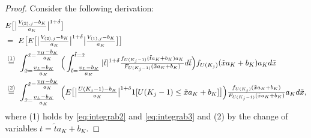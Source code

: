\begin{proof}
Consider the following derivation:
\begin{align}
&E\big[ \big\vert \tfrac{V_{(2),j}-b_{K}}{a_{K}}\big\vert ^{1+\delta } \big] \notag\\
&=~E\big[  E\big[ \big\vert \tfrac{V_{(2),j}-b_{K}}{a_{K}} \big\vert ^{1+\delta }\big\vert \tfrac{V_{(1),j}-b_{K}}{a_{K}}\big] \big] \notag\\
& \overset{(1)}{=}~\int_{\tilde{x}=\tfrac{v_{L}-b_{K}}{a_{K}}}^{\tilde{x}= \tfrac{v_{H}-b_{K}}{a_{K}}}\Big( \int_{\tilde{t}=\tfrac{v_{L}-b_{K}}{a_{K}}}^{ \tilde{t}=\tilde{x}}\vert \tilde{t}\vert ^{1+\delta }\tfrac{ f_{U(K_{j}-1)}( \tilde{t}a_{K}+b_{K}) a_{K}}{ F_{U(K_{j}-1)}( \tilde{x}a_{K}+b_{K}) }d\tilde{t }\Big) f_{U(K_{j})}( \tilde{x}a_{K}+b_{K}) a_{K}d\tilde{x} \nonumber \\
& \overset{(2)}{=}~
\int_{\tilde{x}=\tfrac{v_{L}-b_{K}}{a_{K}}}^{\tilde{x}=\tfrac{v_{H}-b_{K}}{ a_{K}}}\Big( E\big[ \big\vert \tfrac{U(K_{j}-1)-b_{K}}{ a_{K}}\big\vert ^{1+\delta }1[ U(K_{j}-1)\leq \tilde{x}a_{K}+b_{K}] \big] \Big) \tfrac{f_{U(K_{j})}( \tilde{x}a_{K}+b_{K}) }{F_{U(K_{j}-1)}( \tilde{x}a_{K}+b_{K}) }a_{K}d\tilde{x}, \label{eq:integrab4}
\end{align}
where (1) holds by \eqref{eq:integrab2} and \eqref{eq:integrab3} and (2) by the change of variables $t=\tilde{t}a_{K}+b_{K}$.


\end{proof}
